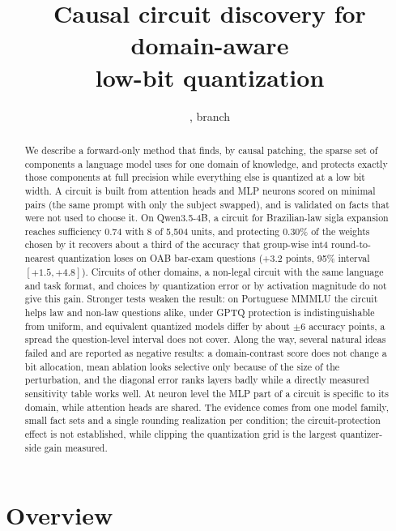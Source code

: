 \documentclass[11pt]{article}
\title{Causal circuit discovery for domain-aware\\low-bit quantization}
\author{\code{pretty\_duck}, branch \code{feature/domain-compression}}
\date{}
\begin{document}
\maketitle

\begin{abstract}
We describe a forward-only method that finds, by causal patching, the sparse set of components a language
model uses for one domain of knowledge, and protects exactly those components at full precision while
everything else is quantized at a low bit width. A circuit is built from attention heads and MLP neurons
scored on minimal pairs (the same prompt with only the subject swapped), and is validated on facts that were
not used to choose it. On Qwen3.5-4B, a circuit for Brazilian-law sigla expansion reaches sufficiency 0.74 with 8 of
5{,}504 units, and protecting 0.30\% of the weights chosen by it recovers about a third of the accuracy that
group-wise int4 round-to-nearest quantization loses on OAB bar-exam questions (+3.2 points, 95\% interval $[+1.5,+4.8]$).
Circuits of other domains, a non-legal circuit with the same language and task format, and choices by quantization error or
by activation magnitude do not give this gain. Stronger tests weaken the result: on Portuguese MMMLU the circuit helps law and
non-law questions alike, under GPTQ protection is indistinguishable from uniform, and equivalent quantized models differ by
about $\pm6$ accuracy points, a spread the question-level interval does not cover. Along the way, several natural ideas failed and are reported as
negative results: a domain-contrast score does not change a bit allocation, mean ablation looks selective only because of
the size of the perturbation, and the diagonal error ranks layers badly while a directly measured sensitivity table
works well. At neuron level the MLP part of a circuit is specific to its domain, while attention heads are shared.
The evidence comes from one model family, small fact sets and a single rounding realization per condition; the circuit-protection effect is not established, while clipping the quantization grid is the largest quantizer-side gain measured.
\end{abstract}

\section{Overview}
\end{document}
